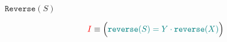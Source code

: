 
\begin{frame}{}
  \begin{exampleblock}{$\texttt{Reverse}(S)$}
  \end{exampleblock}

  \pause
  \[
    \textcolor{red}{I} \equiv \Big(\textcolor{teal}{\texttt{reverse}(S) = Y \cdot \texttt{reverse}(X)}\Big)
  \]
\end{frame}
